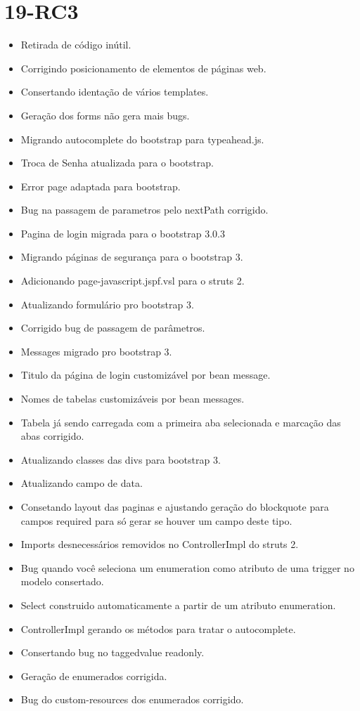 \section{19-RC3}

\begin{itemize}
  \item Retirada de código inútil.
  \item Corrigindo posicionamento de elementos de páginas web.
  \item Consertando identação de vários templates.
  \item Geração dos forms não gera mais bugs.
  \item Migrando autocomplete do bootstrap para typeahead.js.
  \item Troca de Senha atualizada para o bootstrap.
  \item Error page adaptada para bootstrap.
  \item Bug na passagem de parametros pelo nextPath corrigido.
  \item Pagina de login migrada para o bootstrap 3.0.3
  \item Migrando páginas de segurança para o bootstrap 3.
  \item Adicionando page-javascript.jspf.vsl para o struts 2.
  \item Atualizando formulário pro bootstrap 3.
  \item Corrigido bug de passagem de parâmetros.
  \item Messages migrado pro bootstrap 3.
  \item Titulo da página de login customizável por bean message.
  \item Nomes de tabelas customizáveis por bean messages.
  \item Tabela já sendo carregada com a primeira aba selecionada e marcação das
abas corrigido.
  \item Atualizando classes das divs para bootstrap 3.
  \item Atualizando campo de data.
  \item Consetando layout das paginas e ajustando geração do blockquote para
campos required para só gerar se houver um campo deste tipo.
  \item Imports desnecessários removidos no ControllerImpl do struts 2.
  \item Bug quando você seleciona um enumeration como atributo de uma trigger no
modelo consertado.
  \item Select construido automaticamente a partir de um atributo enumeration.
  \item ControllerImpl gerando os métodos para tratar o autocomplete.
  \item Consertando bug no taggedvalue readonly.
  \item Geração de enumerados corrigida.
  \item Bug do custom-resources dos enumerados corrigido.
\end{itemize}

